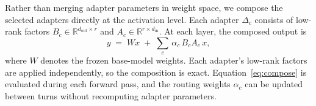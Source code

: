 Rather than merging adapter parameters in weight space, we compose the selected adapters directly at the activation level. Each adapter $\Delta_c$ consists of low-rank factors $B_c \in \mathbb{R}^{d_{\text{out}} \times r}$ and $A_c \in \mathbb{R}^{r \times d_{\text{in}}}$. At each layer, the composed output is
\begin{equation}
y \;=\; Wx \;+\; \sum_{c}\, \alpha_c \, B_c A_c \, x,
\label{eq:compose}
\end{equation}
where $W$ denotes the frozen base-model weights. Each adapter's low-rank factors are applied independently, so the composition is exact. Equation~\ref{eq:compose} is evaluated during each forward pass, and the routing weights $\alpha_c$ can be updated between turns without recomputing adapter parameters.